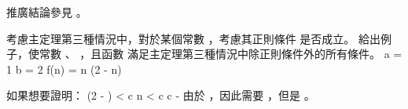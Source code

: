 推廣結論參見 。
\stopANSWER

\startEXERCISE \DIFFICULT
考慮主定理第三種情況中，對於某個常數 ，考慮其正則條件  是否成立。
給出例子，使常數 、 ，且函數  滿足主定理第三種情況中除正則條件外的所有條件。
\stopEXERCISE
\startANSWER
\startformula\startmathalignment
\NC a \NC = 1 \NR
\NC b \NC = 2 \NR
\NC f(n) \NC = n (2 - \cos n) \NR
\stopmathalignment\stopformula

如果想要證明：
\startformula\startmathalignment[n=1]
\NC {}(2 - \cos {}) < c n \NR
\NC {} < c \NR
\NC c  -  \NR
\stopmathalignment\stopformula
由於 ，因此需要 ，但是 。
\stopANSWER

\stopsection

